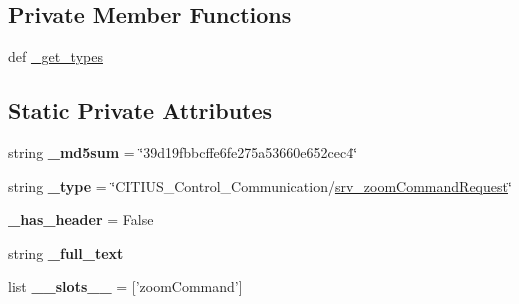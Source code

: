 \subsection*{\-Private \-Member \-Functions}
\begin{DoxyCompactItemize}
\item 
def \hyperlink{class_c_i_t_i_u_s___control___communication_1_1srv_1_1__srv__zoom_command_1_1srv__zoom_command_request_ad6e30bef18b21e22e3d4d6d189d7fd5b}{\-\_\-get\-\_\-types}
\end{DoxyCompactItemize}
\subsection*{\-Static \-Private \-Attributes}
\begin{DoxyCompactItemize}
\item 
\hypertarget{class_c_i_t_i_u_s___control___communication_1_1srv_1_1__srv__zoom_command_1_1srv__zoom_command_request_af9d72105b8cdffbd2eb4635b1f2e884b}{string {\bfseries \-\_\-md5sum} = \char`\"{}39d19fbbcffe6fe275a53660e652cec4\char`\"{}}\label{class_c_i_t_i_u_s___control___communication_1_1srv_1_1__srv__zoom_command_1_1srv__zoom_command_request_af9d72105b8cdffbd2eb4635b1f2e884b}

\item 
\hypertarget{class_c_i_t_i_u_s___control___communication_1_1srv_1_1__srv__zoom_command_1_1srv__zoom_command_request_aa422f48f80830a592d9f7d9a5083fe29}{string {\bfseries \-\_\-type} = \char`\"{}\-C\-I\-T\-I\-U\-S\-\_\-\-Control\-\_\-\-Communication/\hyperlink{class_c_i_t_i_u_s___control___communication_1_1srv_1_1__srv__zoom_command_1_1srv__zoom_command_request}{srv\-\_\-zoom\-Command\-Request}\char`\"{}}\label{class_c_i_t_i_u_s___control___communication_1_1srv_1_1__srv__zoom_command_1_1srv__zoom_command_request_aa422f48f80830a592d9f7d9a5083fe29}

\item 
\hypertarget{class_c_i_t_i_u_s___control___communication_1_1srv_1_1__srv__zoom_command_1_1srv__zoom_command_request_ad5f8899bb9f862b2a5904d0ef6b62255}{{\bfseries \-\_\-has\-\_\-header} = \-False}\label{class_c_i_t_i_u_s___control___communication_1_1srv_1_1__srv__zoom_command_1_1srv__zoom_command_request_ad5f8899bb9f862b2a5904d0ef6b62255}

\item 
string {\bfseries \-\_\-full\-\_\-text}
\item 
\hypertarget{class_c_i_t_i_u_s___control___communication_1_1srv_1_1__srv__zoom_command_1_1srv__zoom_command_request_a08ba54fb88c3320ff90ded8fbf48564e}{list {\bfseries \-\_\-\-\_\-slots\-\_\-\-\_\-} = \mbox{[}'zoom\-Command'\mbox{]}}\label{class_c_i_t_i_u_s___control___communication_1_1srv_1_1__srv__zoom_command_1_1srv__zoom_command_request_a08ba54fb88c3320ff90ded8fbf48564e}


\end{DoxyCompactItemize}
